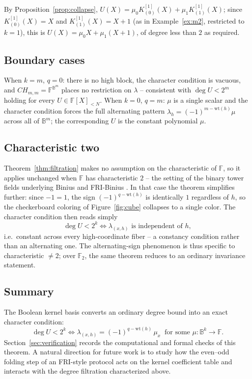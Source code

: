 \documentclass[preprint,3p,12pt,numbers]{elsarticle}
\theoremstyle{definition}
\theoremstyle{remark}
\newcommand{\wt}{\mathrm{wt}}
\begin{document}
By Proposition~\ref{prop:collapse}, $U(X) = \mu_0 K_{(0)}^{[1]}(X) +
\mu_1 K_{(1)}^{[1]}(X)$; since $K_{(0)}^{[1]}(X)=X$ and
$K_{(1)}^{[1]}(X)=X+1$ (as in Example~\ref{ex:m2}, restricted to $k=1$),
this is $U(X) = \mu_0 X + \mu_1(X+1)$, of degree less than $2$ as
required.

\subsection{Boundary cases}
\label{subsec:boundary}

When $k=m$, $q=0$: there is no high block, the character condition is
vacuous, and $CH_{m,m} = \mathbb{F}^{\mathbb{B}^m}$ places no restriction
on $\lambda$ -- consistent with $\deg U < 2^m$ holding for every
$U \in \mathbb{F}[X]_{<N}$. When $k=0$, $q=m$: $\mu$ is a single scalar
and the character condition forces the full alternating pattern
$\lambda_h = (-1)^{m-\wt(h)}\mu$ across all of $\mathbb{B}^m$; the
corresponding $U$ is the constant polynomial $\mu$.

\subsection{Characteristic two}
\label{subsec:char2}

Theorem~\ref{thm:filtration} makes no assumption on the characteristic of
$\mathbb{F}$, so it applies unchanged when $\mathbb{F}$ has characteristic
$2$ -- the setting of the binary tower fields underlying Binius and
FRI-Binius \citep{DiamondPosen2026FRIBinius}. In that case the theorem
simplifies further: since $-1=1$, the sign $(-1)^{q-\wt(h)}$ is
identically $1$ regardless of $h$, so the checkerboard coloring of
Figure~\ref{fig:cube} collapses to a single color. The character
condition then reads simply
\[
  \deg U < 2^k \iff \lambda_{(x,h)} \text{ is independent of } h,
\]
i.e.\ constant across every high-coordinate fiber -- a constancy
condition rather than an alternating one. The alternating-sign phenomenon
is thus specific to characteristic $\neq 2$; over $\mathbb{F}_2$, the same
theorem reduces to an ordinary invariance statement.

\subsection{Summary}
\label{subsec:filt-summary}

The Boolean kernel basis converts an ordinary degree bound into an exact
character condition:
\[
  \deg U < 2^k
  \iff
  \lambda_{(x,h)} = (-1)^{q-\wt(h)}\, \mu_x
  \ \text{ for some } \mu : \mathbb{B}^k \to \mathbb{F} .
\]
Section~\ref{sec:verification} records the computational and formal checks
of this theorem. A natural direction for future work is to study how the even--odd
folding step of an FRI-style protocol acts on the kernel coefficient table
and interacts with the degree filtration characterized above.
\end{document}
